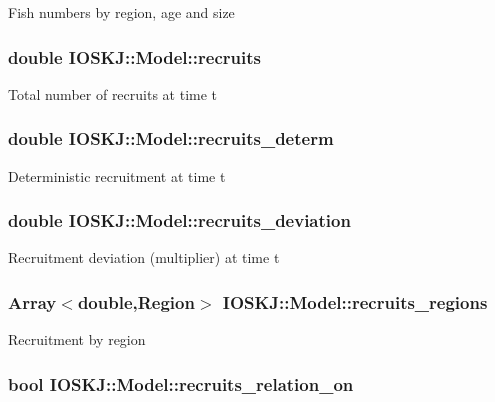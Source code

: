 Fish numbers by region, age and size \hypertarget{classIOSKJ_1_1Model_a8ffa15a7aea7598d5a6c91bec5779ef3}{
\subsubsection[{recruits}]{\setlength{\rightskip}{0pt plus 5cm}double I\-O\-S\-K\-J\-::\-Model\-::recruits}}\label{classIOSKJ_1_1Model_a8ffa15a7aea7598d5a6c91bec5779ef3}
Total number of recruits at time t \hypertarget{classIOSKJ_1_1Model_ad2450f5604c657cbe259b7b49e8f905a}{
\subsubsection[{recruits\-\_\-determ}]{\setlength{\rightskip}{0pt plus 5cm}double I\-O\-S\-K\-J\-::\-Model\-::recruits\-\_\-determ}}\label{classIOSKJ_1_1Model_ad2450f5604c657cbe259b7b49e8f905a}
Deterministic recruitment at time t \hypertarget{classIOSKJ_1_1Model_a639afa6cd0480ad8c6dbac286bdaa55c}{
\subsubsection[{recruits\-\_\-deviation}]{\setlength{\rightskip}{0pt plus 5cm}double I\-O\-S\-K\-J\-::\-Model\-::recruits\-\_\-deviation}}\label{classIOSKJ_1_1Model_a639afa6cd0480ad8c6dbac286bdaa55c}
Recruitment deviation (multiplier) at time t \hypertarget{classIOSKJ_1_1Model_a735f9a4288dc9fc4ca836c9ad3af3161}{
\subsubsection[{recruits\-\_\-regions}]{\setlength{\rightskip}{0pt plus 5cm}Array$<$double,Region$>$ I\-O\-S\-K\-J\-::\-Model\-::recruits\-\_\-regions}}\label{classIOSKJ_1_1Model_a735f9a4288dc9fc4ca836c9ad3af3161}
Recruitment by region \hypertarget{classIOSKJ_1_1Model_a88f9a0d53e76f9a88bf0d81c30bdb612}{
\subsubsection[{recruits\-\_\-relation\-\_\-on}]{\setlength{\rightskip}{0pt plus 5cm}bool I\-O\-S\-K\-J\-::\-Model\-::recruits\-\_\-relation\-\_\-on}}\label{classIOSKJ_1_1Model_a88f9a0d53e76f9a88bf0d81c30bdb612}
